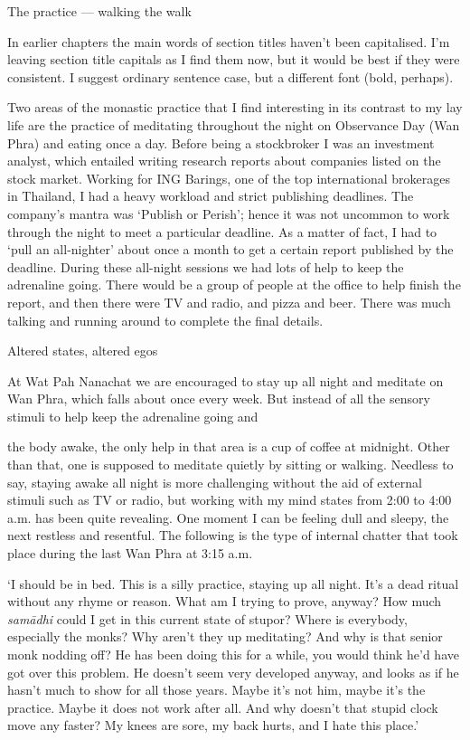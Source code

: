 The practice --- walking the walk

In earlier chapters the main words of section titles haven't been
capitalised. I'm leaving section title capitals as I find them now, but
it would be best if they were consistent. I suggest ordinary sentence
case, but a different font (bold, perhaps).

Two areas of the monastic practice that I find interesting in its
contrast to my lay life are the practice of meditating throughout the
night on Observance Day (Wan Phra) and eating once a day. Before being a
stockbroker I was an investment analyst, which entailed writing research
reports about companies listed on the stock market. Working for ING
Barings, one of the top international brokerages in Thailand, I had a
heavy workload and strict publishing deadlines. The company's mantra was
`Publish or Perish'; hence it was not uncommon to work through the night
to meet a particular deadline. As a matter of fact, I had to `pull an
all-nighter' about once a month to get a certain report published by the
deadline. During these all-night sessions we had lots of help to keep
the adrenaline going. There would be a group of people at the office to
help finish the report, and then there were TV and radio, and pizza and
beer. There was much talking and running around to complete the final
details.

Altered states, altered egos

At Wat Pah Nanachat we are encouraged to stay up all night and meditate
on Wan Phra, which falls about once every week. But instead of all the
sensory stimuli to help keep the adrenaline going and

the body awake, the only help in that area is a cup of coffee at
midnight. Other than that, one is supposed to meditate quietly by
sitting or walking. Needless to say, staying awake all night is more
challenging without the aid of external stimuli such as TV or radio, but
working with my mind states from 2:00 to 4:00 a.m. has been quite
revealing. One moment I can be feeling dull and sleepy, the next
restless and resentful. The following is the type of internal chatter
that took place during the last Wan Phra at 3:15 a.m.

`I should be in bed. This is a silly practice, staying up all night.
It's a dead ritual without any rhyme or reason. What am I trying to
prove, anyway? How much \emph{samādhi} could I get in this current state
of stupor? Where is everybody, especially the monks? Why aren't they up
meditating? And why is that senior monk nodding off? He has been doing
this for a while, you would think he'd have got over this problem. He
doesn't seem very developed anyway, and looks as if he hasn't much to
show for all those years. Maybe it's not him, maybe it's the practice.
Maybe it does not work after all. And why doesn't that stupid clock move
any faster? My knees are sore, my back hurts, and I hate this place.'

